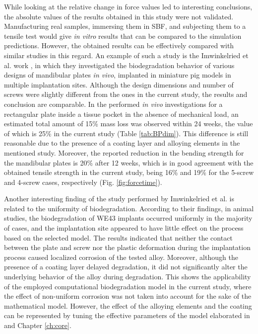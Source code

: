 While looking at the relative change in force values led to interesting conclusions, the absolute values of the results obtained in this study were not validated. Manufacturing real samples, immersing them in \gls{SBF}, and subjecting them to a tensile test would give \textit{in vitro} results that can be compared to the simulation predictions. However, the obtained results can be effectively compared with similar studies in this regard. An example of such a study is the Imwinkelried et al. work \cite{Imwinkelried2020}, in which they investigated the biodegradation behavior of various designs of mandibular plates \textit{in vivo}, implanted in miniature pig models in multiple implantation sites. Although the design dimensions and number of screws were slightly different from the ones in the current study, the results and conclusion are comparable. In the performed \textit{in vivo} investigations for a rectangular plate inside a tissue pocket in the absence of mechanical load, an estimated total amount of 15\% mass loss was observed within 24 weeks, the value of which is 25\% in the current study (Table \ref{tab:BPdim}). This difference is still reasonable due to the presence of a coating layer and alloying elements in the mentioned study. Moreover, the reported reduction in the bending strength for the mandibular plates is 20\% after 12 weeks, which is in good agreement with the obtained tensile strength in the current study, being 16\% and 19\% for the 5-screw and 4-screw cases, respectively (Fig. \ref{fig:forcetime}).

Another interesting finding of the study performed by Imwinkelried et al. \cite{Imwinkelried2020} is related to the uniformity of biodegradation. According to their findings, in animal studies, the biodegradation of WE43 implants occurred uniformly in the majority of cases, and the implantation site appeared to have little effect on the process based on the selected model. The results indicated that neither the contact between the plate and screw nor the plastic deformation during the implantation process caused localized corrosion of the tested alloy. Moreover, although the presence of a coating layer delayed degradation, it did not significantly alter the underlying behavior of the alloy during degradation. This shows the applicability of the employed computational biodegradation model in the current study, where the effect of non-uniform corrosion was not taken into account for the sake of the mathematical model. However, the effect of the alloying elements and the coating can be represented by tuning the effective parameters of the model elaborated in \cite{Barzegari2021} and Chapter \ref{ch:core}.

